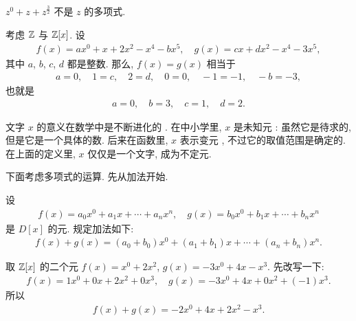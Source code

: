\begin{example}
    $z^0 + z + z^{\frac{3}{2}}$ 不是 $z$ 的多项式.
\end{example}

\begin{example}
    考虑 $\mathbb{Z}$ 与 $\mathbb{Z}[x]$. 设
    \begin{align*}
        f(x) = ax^0 + x + 2x^2 - x^4 - bx^5, \quad g(x) = cx + dx^2 - x^4 - 3x^5,
    \end{align*}
    其中 $a$, $b$, $c$, $d$ 都是整数. 那么, $f(x) = g(x)$ 相当于
    \begin{align*}
        a = 0, \quad 1 = c, \quad 2 = d, \quad 0 = 0, \quad -1 = -1, \quad -b = -3,
    \end{align*}
    也就是
    \begin{align*}
        a = 0, \quad b = 3, \quad c = 1, \quad d = 2.
    \end{align*}
\end{example}

\begin{remark}
    文字 $x$ 的意义在数学中是不断进化的 . 在中小学里, $x$ 是未知元 : 虽然它是待求的, 但是它是一个具体的数. 后来在函数里, $x$ 表示变元 , 不过它的取值范围是确定的. 在上面的定义里, $x$ 仅仅是一个文字, 成为不定元.
\end{remark}

下面考虑多项式的运算. 先从加法开始.

\begin{definition}
    设
    \begin{align*}
        f(x) = a_0 x^0 + a_1 x + \cdots + a_n x^n, \quad g(x) = b_0 x^0 + b_1 x + \cdots + b_n x^n
    \end{align*}
    是 $D[x]$ 的元. 规定加法如下:
    \begin{align*}
        f(x) + g(x) = (a_0 + b_0) x^0 + (a_1 + b_1) x + \cdots + (a_n + b_n) x^n.
    \end{align*}
\end{definition}

\begin{example}
    取 $\mathbb{Z}[x]$ 的二个元 $f(x)=x^0 + 2x^2$, $g(x)=-3x^0 + 4x - x^3$. 先改写一下:
    \begin{align*}
        f(x) = 1x^0 + 0x + 2x^2 + 0x^3, \quad g(x) = -3x^0 + 4x + 0x^2 + (-1)x^3.
    \end{align*}
    所以
    \begin{align*}
        f(x) + g(x) = -2x^0 + 4x + 2x^2 - x^3.
    \end{align*}
\end{example}

